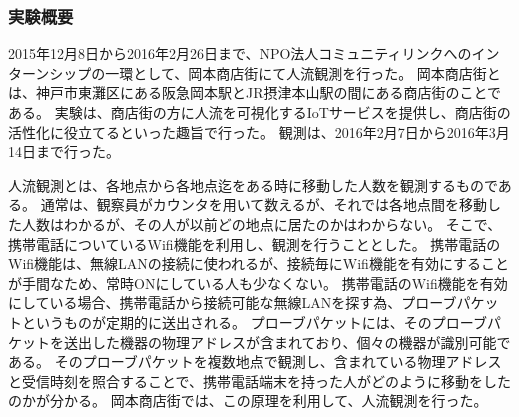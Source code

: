 \subsubsection{実験概要}
2015年12月8日から2016年2月26日まで、NPO法人コミュニティリンクへのインターンシップの一環として、岡本商店街にて人流観測を行った。
岡本商店街とは、神戸市東灘区にある阪急岡本駅とJR摂津本山駅の間にある商店街のことである。
実験は、商店街の方に人流を可視化するIoTサービスを提供し、商店街の活性化に役立てるといった趣旨で行った。
観測は、2016年2月7日から2016年3月14日まで行った。

人流観測とは、各地点から各地点迄をある時に移動した人数を観測するものである。
通常は、観察員がカウンタを用いて数えるが、それでは各地点間を移動した人数はわかるが、その人が以前どの地点に居たのかはわからない。
そこで、携帯電話についているWifi機能を利用し、観測を行うこととした。
携帯電話のWifi機能は、無線LANの接続に使われるが、接続毎にWifi機能を有効にすることが手間なため、常時ONにしている人も少なくない。
携帯電話のWifi機能を有効にしている場合、携帯電話から接続可能な無線LANを探す為、プローブパケットというものが定期的に送出される。
プローブパケットには、そのプローブパケットを送出した機器の物理アドレスが含まれており、個々の機器が識別可能である。
そのプローブパケットを複数地点で観測し、含まれている物理アドレスと受信時刻を照合することで、携帯電話端末を持った人がどのように移動をしたのかが分かる。
岡本商店街では、この原理を利用して、人流観測を行った。

